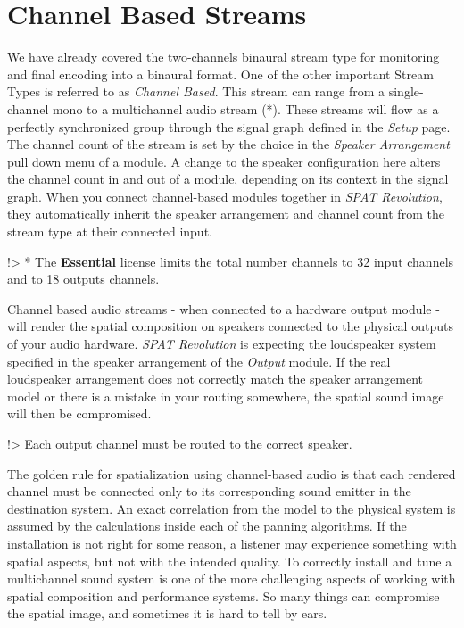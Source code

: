 \documentclass[
  letterpaper,
  DIV=11,
  numbers=noendperiod]{scrreport}
\begin{document}
\hypertarget{channel-based-streams}{%
\chapter{Channel Based Streams}\label{channel-based-streams}}

We have already covered the two-channels binaural stream type for
monitoring and final encoding into a binaural format. One of the other
important Stream Types is referred to as \emph{Channel Based}. This
stream can range from a single-channel mono to a multichannel audio
stream (*). These streams will flow as a perfectly synchronized group
through the signal graph defined in the \emph{Setup} page. The channel
count of the stream is set by the choice in the \emph{Speaker
Arrangement} pull down menu of a module. A change to the speaker
configuration here alters the channel count in and out of a module,
depending on its context in the signal graph. When you connect
channel-based modules together in \emph{SPAT Revolution}, they
automatically inherit the speaker arrangement and channel count from the
stream type at their connected input.

!\textgreater{} * The \textbf{Essential} license limits the total number
channels to 32 input channels and to 18 outputs channels.

Channel based audio streams - when connected to a hardware output module
- will render the spatial composition on speakers connected to the
physical outputs of your audio hardware. \emph{SPAT Revolution} is
expecting the loudspeaker system specified in the speaker arrangement of
the \emph{Output} module. If the real loudspeaker arrangement does not
correctly match the speaker arrangement model or there is a mistake in
your routing somewhere, the spatial sound image will then be
compromised.

!\textgreater{} Each output channel must be routed to the correct
speaker.

The golden rule for spatialization using channel-based audio is that
each rendered channel must be connected only to its corresponding sound
emitter in the destination system. An exact correlation from the model
to the physical system is assumed by the calculations inside each of the
panning algorithms. If the installation is not right for some reason, a
listener may experience something with spatial aspects, but not with the
intended quality. To correctly install and tune a multichannel sound
system is one of the more challenging aspects of working with spatial
composition and performance systems. So many things can compromise the
spatial image, and sometimes it is hard to tell by ears.
\end{document}
